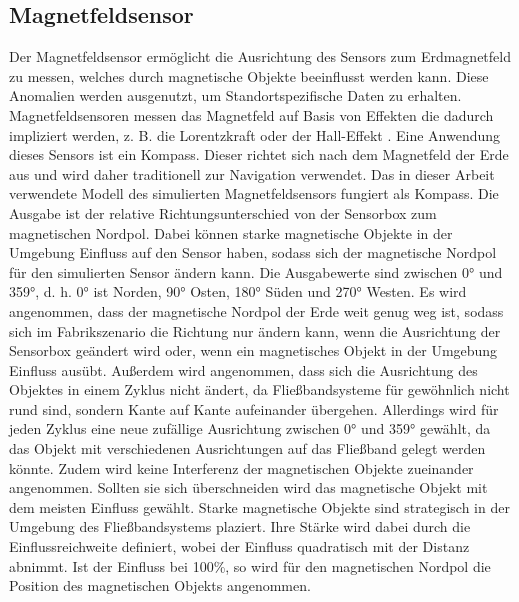 \subsection{Magnetfeldsensor}
Der Magnetfeldsensor ermöglicht die Ausrichtung des Sensors zum Erdmagnetfeld zu messen, welches durch magnetische Objekte beeinflusst werden kann.
Diese Anomalien werden ausgenutzt, um Standortspezifische Daten zu erhalten.
Magnetfeldsensoren messen das Magnetfeld auf Basis von Effekten die dadurch impliziert werden, z. B. die Lorentzkraft oder der Hall-Effekt \cite{thompsonMEMS}.
Eine Anwendung dieses Sensors ist ein Kompass.
Dieser richtet sich nach dem Magnetfeld der Erde aus und wird daher traditionell zur Navigation verwendet.
\newline
\newline
Das in dieser Arbeit verwendete Modell des simulierten Magnetfeldsensors fungiert als Kompass.
Die Ausgabe ist der relative Richtungsunterschied von der Sensorbox zum magnetischen Nordpol.
Dabei können starke magnetische Objekte in der Umgebung Einfluss auf den Sensor haben,
sodass sich der magnetische Nordpol für den simulierten Sensor ändern kann.
Die Ausgabewerte sind zwischen 0° und 359°, d. h. 0° ist Norden, 90° Osten, 180° Süden und 270° Westen.
\newline
\newline
Es wird angenommen, dass der magnetische Nordpol der Erde weit genug weg ist,
sodass sich im Fabrikszenario die Richtung nur ändern kann, wenn die Ausrichtung der Sensorbox geändert wird
oder, wenn ein magnetisches Objekt in der Umgebung Einfluss ausübt.
Außerdem wird angenommen, dass sich die Ausrichtung des Objektes in einem Zyklus nicht ändert,
da Fließbandsysteme für gewöhnlich nicht rund sind, sondern Kante auf Kante aufeinander übergehen.
Allerdings wird für jeden Zyklus eine neue zufällige Ausrichtung zwischen 0° und 359° gewählt,
da das Objekt mit verschiedenen Ausrichtungen auf das Fließband gelegt werden könnte.
Zudem wird keine Interferenz der magnetischen Objekte zueinander angenommen.
Sollten sie sich überschneiden wird das magnetische Objekt mit dem meisten Einfluss gewählt.
\newline
\newline
Starke magnetische Objekte sind strategisch in der Umgebung des Fließbandsystems plaziert.
Ihre Stärke wird dabei durch die Einflussreichweite definiert, wobei der Einfluss quadratisch mit der Distanz abnimmt.
Ist der Einfluss bei 100\%, so wird für den magnetischen Nordpol die Position des magnetischen Objekts angenommen.
